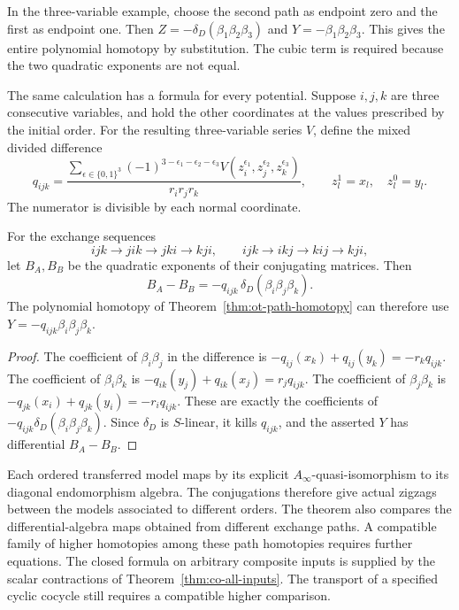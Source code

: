In the three-variable example, choose the second path as
endpoint zero and the first as endpoint one. Then
\(Z=-\delta_D(\beta_1\beta_2\beta_3)\) and
\(Y=-\beta_1\beta_2\beta_3\).
This gives the entire polynomial homotopy by substitution.
The cubic term is required because the two quadratic exponents
are not equal.

The same calculation has a formula for every potential.
Suppose \(i,j,k\) are three consecutive variables, and hold
the other coordinates at the values prescribed by the initial
order. For the resulting three-variable series \(V\), define
the mixed divided difference
\[
 q_{ijk}=
 \frac{\displaystyle
   \sum_{\epsilon\in\{0,1\}^3}
    (-1)^{3-\epsilon_1-\epsilon_2-\epsilon_3}
    V(z_i^{\epsilon_1},z_j^{\epsilon_2},z_k^{\epsilon_3})}
 {r_i r_j r_k},
 \qquad z_l^1=x_l,\quad z_l^0=y_l.
\]
The numerator is divisible by each normal coordinate.

\begin{corollary}\label{cor:ot-braid}
For the exchange sequences
\[
 ijk\to jik\to jki\to kji,\qquad
 ijk\to ikj\to kij\to kji,
\]
let \(B_A,B_B\) be the quadratic exponents of their
conjugating matrices. Then
\[
 B_A-B_B=-q_{ijk}\,
             \delta_D(\beta_i\beta_j\beta_k).
\]
The polynomial homotopy of Theorem~\ref{thm:ot-path-homotopy}
can therefore use \(Y=-q_{ijk}\beta_i\beta_j\beta_k\).
\end{corollary}

\begin{proof}
The coefficient of \(\beta_i\beta_j\) in the difference
is \(-q_{ij}(x_k)+q_{ij}(y_k)=-r_kq_{ijk}\).
The coefficient of \(\beta_i\beta_k\) is
\(-q_{ik}(y_j)+q_{ik}(x_j)=r_jq_{ijk}\).
The coefficient of \(\beta_j\beta_k\) is
\(-q_{jk}(x_i)+q_{jk}(y_i)=-r_iq_{ijk}\).
These are exactly the coefficients of
\(-q_{ijk}\delta_D(\beta_i\beta_j\beta_k)\).
Since \(\delta_D\) is \(S\)-linear, it kills \(q_{ijk}\),
and the asserted \(Y\) has differential \(B_A-B_B\).
\end{proof}

Each ordered transferred model maps by its explicit
\(A_\infty\)-quasi-isomorphism to its diagonal endomorphism
algebra. The conjugations therefore give actual zigzags between
the models associated to different orders. The theorem also
compares the differential-algebra maps obtained from different
exchange paths. A compatible family of higher homotopies among
these path homotopies requires further equations. The closed
formula on arbitrary composite inputs is supplied by the scalar
contractions of Theorem~\ref{thm:co-all-inputs}. The transport of a
specified cyclic cocycle still requires a compatible higher comparison.
